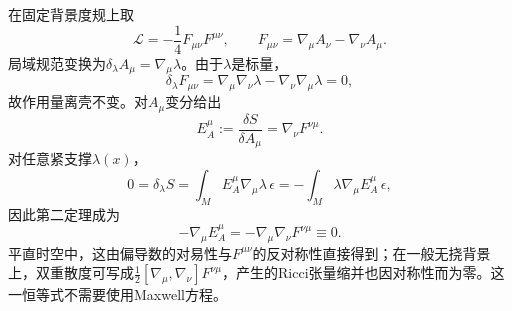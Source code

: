 \begin{example}[Maxwell场的规范恒等式]
    在固定背景度规上取
    \begin{equation}
        \mathcal L=-\frac14F_{\mu\nu}F^{\mu\nu},
        \qquad F_{\mu\nu}=\nabla_{\mu}A_{\nu}-\nabla_{\nu}A_{\mu}.
    \end{equation}
    局域规范变换为$\delta_\lambda A_{\mu}=\nabla_{\mu}\lambda$。由于$\lambda$是标量，
    \begin{equation}
        \delta_\lambda F_{\mu\nu}
        =\nabla_{\mu}\nabla_{\nu}\lambda-\nabla_{\nu}\nabla_{\mu}\lambda=0,
    \end{equation}
    故作用量离壳不变。对$A_{\mu}$变分给出
    \begin{equation}
        E_A^{\mu}:=\frac{\delta S}{\delta A_{\mu}}=\nabla_{\nu}F^{\nu\mu}.
    \end{equation}
    对任意紧支撑$\lambda(x)$，
    \begin{equation}
        0=\delta_\lambda S
        =\int_M E_A^{\mu}\nabla_{\mu}\lambda\,\epsilon
        =-\int_M\lambda\nabla_{\mu}E_A^{\mu}\,\epsilon,
    \end{equation}
    因此第二定理成为
    \begin{equation}
        \boxed{-\nabla_{\mu}E_A^{\mu}=-\nabla_{\mu}\nabla_{\nu}F^{\nu\mu}\equiv0.}
    \end{equation}
    平直时空中，这由偏导数的对易性与$F^{\mu\nu}$的反对称性直接得到；在一般无挠背景上，双重散度可写成$\tfrac12[\nabla_{\mu},\nabla_{\nu}]F^{\nu\mu}$，产生的Ricci张量缩并也因对称性而为零。这一恒等式不需要使用Maxwell方程。
\end{example}

